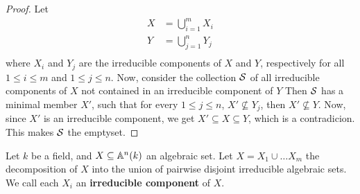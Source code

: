 \begin{proof}
    Let
    \begin{align*}
        X   &= \bigcup_{i=1}^m{X_i} \\
        Y   &= \bigcup_{j=1}^n{Y_j} \\
    \end{align*}
    where $X_i$ and $Y_j$ are the irreducible components of  $X$ and  $Y$,
    respectively for all  $1 \leq i \leq m$ and $1 \leq j \leq n$. Now, consider
    the collection $\mathcal{S}$ of all irreducible components of $X$ not contained in
    an irreducible component of $Y$ Then $\mathcal{S}$ has a minimal member  $X'$, such
    that for every $1 \leq j \leq n$, $X' \not\subseteq Y_j$, then $X'
    \not\subseteq Y$. Now, since $X'$ is an irreducible component, we get  $X'
    \subseteq X \subseteq Y$, which is a contradicion. This makes $\mathcal{S}$ the
    emptyset.
\end{proof}

\begin{definition}
    Let $k$ be a field, and $X \subseteq \mathbb{A}^n(k)$ an algebraic set. Let $X=X_1
    \cup \dots X_m$ the decomposition of $X$ into the union of pairwise disjoint
    irreducible algebraic sets. We call each $X_i$ an \textbf{irreducible
    component} of $X$.
\end{definition}
